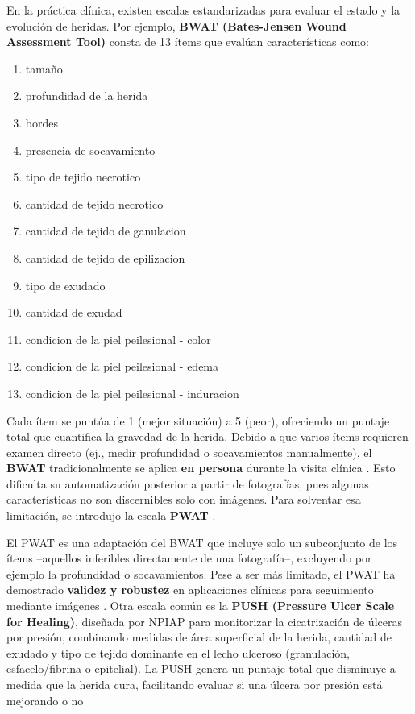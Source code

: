 En la práctica clínica, existen escalas estandarizadas para evaluar el estado y la evolución de heridas. Por ejemplo, \textbf{BWAT (Bates-Jensen Wound Assessment Tool)} consta de 13 ítems que evalúan características como:
\begin{enumerate}
    \item tamaño
    \item profundidad de la herida
    \item bordes
    \item presencia de socavamiento
    \item tipo de tejido necrotico
    \item cantidad de tejido necrotico
    \item cantidad de tejido de ganulacion
    \item cantidad de tejido de epilizacion
    \item tipo de exudado
    \item cantidad de exudad
    \item condicion de la piel peilesional - color
    \item condicion de la piel peilesional - edema
    \item condicion de la piel peilesional - induracion
    
\end{enumerate}
Cada ítem se puntúa de 1 (mejor situación) a 5 (peor), ofreciendo un puntaje total que cuantifica la gravedad de la herida. Debido a que varios ítems requieren examen directo (ej., medir profundidad o socavamientos manualmente), el \textbf{BWAT} tradicionalmente se aplica \textbf{en persona} durante la visita clínica . Esto dificulta su automatización posterior a partir de fotografías, pues algunas características no son discernibles solo con imágenes. Para solventar esa limitación, se introdujo la escala \textbf{PWAT} \cite{Curti2024}. 

El PWAT es una adaptación del BWAT que incluye solo un subconjunto de los ítems –aquellos inferibles directamente de una fotografía–, excluyendo por ejemplo la profundidad o socavamientos. Pese a ser más limitado, el PWAT ha demostrado \textbf{validez y robustez} en aplicaciones clínicas para seguimiento mediante imágenes . Otra escala común es la \textbf{PUSH (Pressure Ulcer Scale for Healing)}, diseñada por NPIAP para monitorizar la cicatrización de úlceras por presión, combinando medidas de área superficial de la herida, cantidad de exudado y tipo de tejido dominante en el lecho ulceroso (granulación, esfacelo/fibrina o epitelial). La PUSH genera un puntaje total que disminuye a medida que la herida cura, facilitando evaluar si una úlcera por presión está mejorando o no

